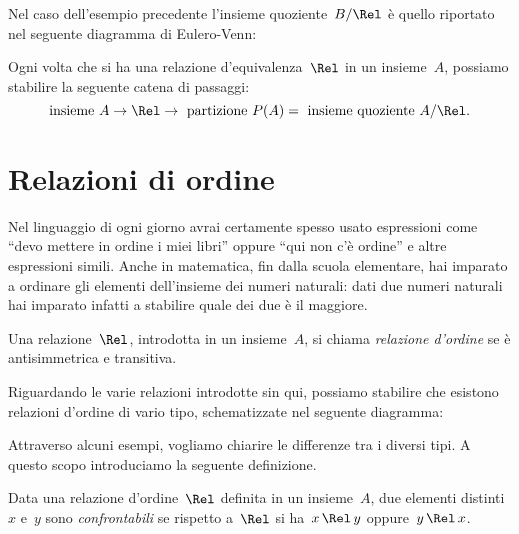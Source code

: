 Nel caso dell'esempio precedente l'insieme quoziente~$B/\Rel$ è quello riportato nel seguente diagramma di Eulero-Venn:
\begin{center}
 
\end{center}

\osservazione Ogni volta che si ha una relazione d'equivalenza~$\Rel$ in un insieme~$A$, possiamo stabilire la seguente
catena di passaggi:
 \[\text{insieme }A\rightarrow\Rel\rightarrow\text{ partizione }P(A)=\text{ insieme quoziente }A/\Rel.\]

\ovalbox{\risolvii \ref{ese:B.32}, \ref{ese:B.33}, \ref{ese:B.34}, \ref{ese:B.35}, \ref{ese:B.36}, \ref{ese:B.37}, \ref{ese:B.38}, \ref{ese:B.39}, \ref{ese:B.40},
\ref{ese:B.41}, \ref{ese:B.42}}

\ovalbox{\ref{ese:B.43}}

\section{Relazioni di ordine}

Nel linguaggio di ogni giorno avrai certamente spesso usato espressioni come ``devo mettere in ordine i miei
libri'' oppure ``qui non c'è ordine'' e altre espressioni simili.
Anche in matematica, fin dalla scuola elementare, hai imparato a ordinare gli elementi dell'insieme dei
numeri naturali: dati due numeri naturali hai imparato infatti a stabilire quale dei due è il maggiore.

\begin{definizione}
Una relazione~$\Rel$, introdotta in un insieme~$A$, si chiama \emph{relazione d'ordine} se è antisimmetrica e transitiva.
\end{definizione}

Riguardando le varie relazioni introdotte sin qui, possiamo stabilire che esistono relazioni d'ordine di vario tipo, schematizzate nel seguente diagramma:
\begin{center}
 
\end{center}

Attraverso alcuni esempi, vogliamo chiarire le differenze tra i diversi tipi. A questo scopo introduciamo la seguente definizione.

\begin{definizione}
Data una relazione d'ordine~$\Rel$ definita in un insieme~$A$, due elementi distinti~$x$ e~$y$ sono \emph{confrontabili} se rispetto a~$\Rel$ si ha~$x \,\Rel\, y$ oppure~$y \,\Rel\, x$.
\end{definizione}

